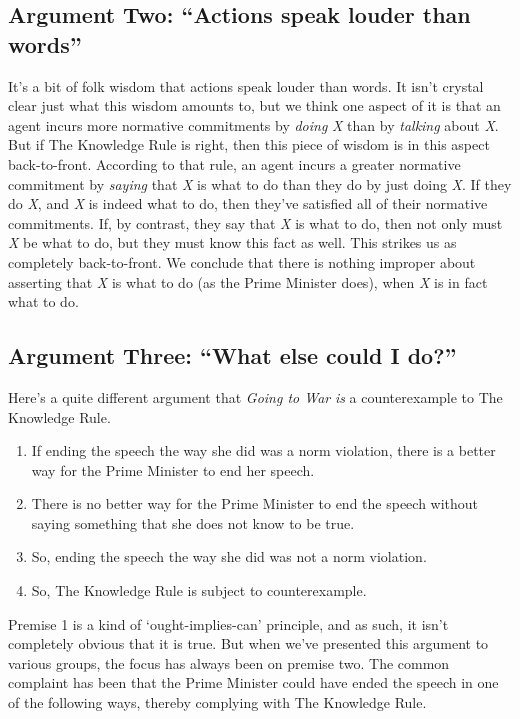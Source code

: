 \subsection*{Argument Two: ``Actions speak louder than words''}

It's a bit of folk wisdom that actions speak louder than words. It isn't crystal clear just what this wisdom amounts to, but we think one aspect of it is that an agent incurs more normative commitments by \textit{doing} \textit{X} than by \textit{talking} about \textit{X}. But if The Knowledge Rule is right, then this piece of wisdom is in this aspect back-to-front. According to that rule, an agent incurs a greater normative commitment by \textit{saying} that \textit{X} is what to do than they do by just doing \textit{X}. If they do \textit{X}, and \textit{X} is indeed what to do, then they've satisfied all of their normative commitments. If, by contrast, they say that \textit{X} is what to do, then not only must \textit{X} be what to do, but they must know this fact as well. This strikes us as completely back-to-front. We conclude that there is nothing improper about asserting that \textit{X} is what to do (as the Prime Minister does), when \textit{X} is in fact what to do.

\subsection*{Argument Three: ``What else could I do?''}

Here's a quite different argument that \textit{Going to War} \textit{is} a counterexample to The Knowledge Rule.

\begin{enumerate}
\item If ending the speech the way she did was a norm violation, there is a better way for the Prime Minister to end her speech.
\item There is no better way for the Prime Minister to end the speech without saying something that she does not know to be true.
\item So, ending the speech the way she did was not a norm violation.
\item So, The Knowledge Rule is subject to counterexample.
\end{enumerate}

\noindent Premise 1 is a kind of `ought-implies-can' principle, and as such, it isn't completely obvious that it is true. But when we've presented this argument to various groups, the focus has always been on premise two. The common complaint has been that the Prime Minister could have ended the speech in one of the following ways, thereby complying with The Knowledge Rule.

